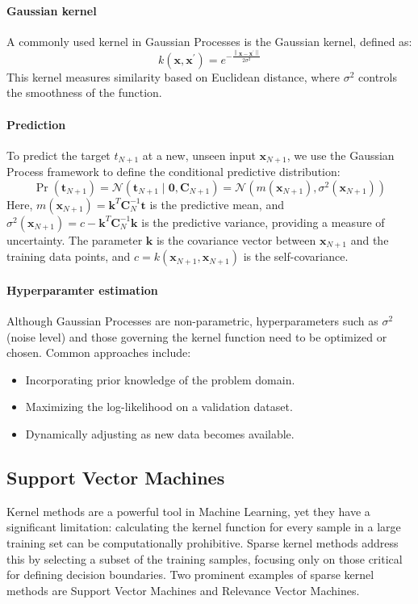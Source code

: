 \paragraph*{Gaussian kernel}
A commonly used kernel in Gaussian Processes is the Gaussian kernel, defined as:
\[k(\mathbf{x},\mathbf{x}^\prime)=e^{-\frac{\left\lVert \mathbf{x}-\mathbf{x}^\prime\right\rVert}{2\sigma^2} }\]
This kernel measures similarity based on Euclidean distance, where $\sigma^2$ controls the smoothness of the function.

\paragraph*{Prediction}
To predict the target $t_{N+1}$ at a new, unseen input $\mathbf{x}_{N+1}$, we use the Gaussian Process framework to define the conditional predictive distribution:
\[\Pr(\mathbf{t}_{N+1})=\mathcal{N}(\mathbf{t}_{N+1}\mid\mathbf{0},\mathbf{C}_{N+1})=\mathcal{N}(m(\mathbf{x}_{N+1}),\sigma^2(\mathbf{x}_{N+1}))\]
Here, $m(\mathbf{x}_{N+1})=\mathbf{k}^T\mathbf{C}_N^{-1}\mathbf{t}$ is the predictive mean, and $\sigma^2(\mathbf{x}_{N+1})=c-\mathbf{k}^T\mathbf{C}_N^{-1}\mathbf{k}$ is the predictive variance, providing a measure of uncertainty.
The parameter $\mathbf{k}$ is the covariance vector between $\mathbf{x}_{N+1}$ and the training data points, and $c=k(\mathbf{x}_{N+1},\mathbf{x}_{N+1})$ is the self-covariance.

\paragraph*{Hyperparamter estimation}
Although Gaussian Processes are non-parametric, hyperparameters such as $\sigma^2$ (noise level) and those governing the kernel function need to be optimized or chosen. Common approaches include:
\begin{itemize}
    \item Incorporating prior knowledge of the problem domain.
    \item Maximizing the log-likelihood on a validation dataset.
    \item Dynamically adjusting as new data becomes available.
\end{itemize}

\subsection{Support Vector Machines}
Kernel methods are a powerful tool in Machine Learning, yet they have a significant limitation: calculating the kernel function for every sample in a large training set can be computationally prohibitive.
Sparse kernel methods address this by selecting a subset of the training samples, focusing only on those critical for defining decision boundaries.
Two prominent examples of sparse kernel methods are Support Vector Machines and Relevance Vector Machines.

